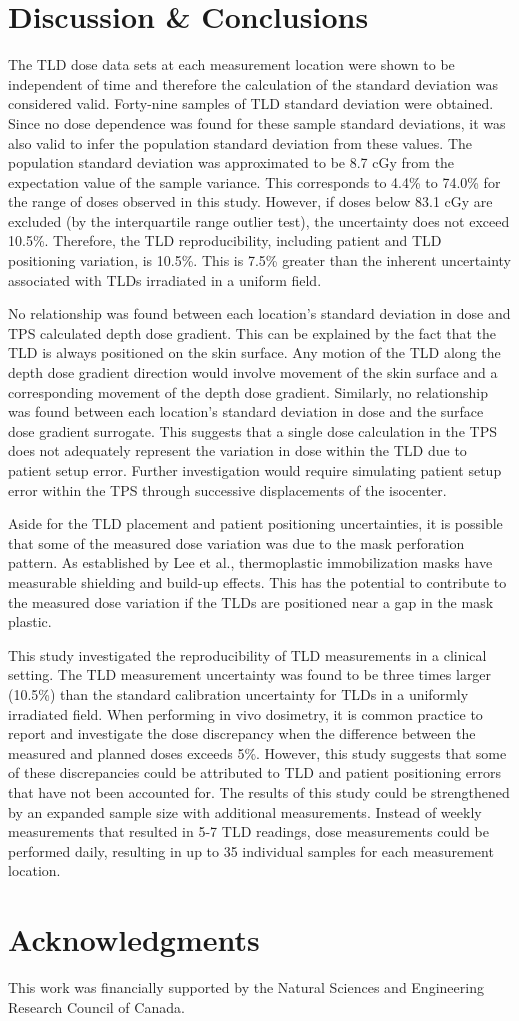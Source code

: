 \section{Discussion \& Conclusions}
The TLD dose data sets at each measurement location were shown to be independent of time and therefore the calculation of the standard deviation was considered valid. Forty-nine samples of TLD standard deviation were obtained. Since no dose dependence was found for these sample standard deviations, it was also valid to infer the population standard deviation from these values. The population standard deviation was approximated to be 8.7 cGy from the expectation value of the sample variance. This corresponds to 4.4\% to 74.0\% for the range of doses observed in this study. However, if doses below 83.1 cGy are excluded (by the interquartile range outlier test), the uncertainty does not exceed 10.5\%. Therefore, the TLD reproducibility, including patient and TLD positioning variation, is 10.5\%. This is 7.5\% greater than the inherent uncertainty associated with TLDs irradiated in a uniform field.

No relationship was found between each location’s standard deviation in dose and TPS calculated depth dose gradient. This can be explained by the fact that the TLD is always positioned on the skin surface. Any motion of the TLD along the depth dose gradient direction would involve movement of the skin surface and a corresponding movement of the depth dose gradient. Similarly, no relationship was found between each location’s standard deviation in dose and the surface dose gradient surrogate. This suggests that a single dose calculation in the TPS does not adequately represent the variation in dose within the TLD due to patient setup error. Further investigation would require simulating patient setup error within the TPS through successive displacements of the isocenter.

Aside for the TLD placement and patient positioning uncertainties, it is possible that some of the measured dose variation was due to the mask perforation pattern. As established by Lee et al.\cite{Lee2002}, thermoplastic immobilization masks have measurable shielding and build-up effects. This has the potential to contribute to the measured dose variation if the TLDs are positioned near a gap in the mask plastic.

This study investigated the reproducibility of TLD measurements in a clinical setting. The TLD measurement uncertainty was found to be three times larger (10.5\%) than the standard calibration uncertainty for TLDs in a uniformly irradiated field. When performing in vivo dosimetry, it is common practice to report and investigate the dose discrepancy when the difference between the measured and planned doses exceeds 5\%.\cite{Essers1999} However, this study suggests that some of these discrepancies could be attributed to TLD and patient positioning errors that have not been accounted for. The results of this study could be strengthened by an expanded sample size with additional measurements. Instead of weekly measurements that resulted in 5-7 TLD readings, dose measurements could be performed daily, resulting in up to 35 individual samples for each measurement location.

\section*{Acknowledgments}
This work was financially supported by the Natural Sciences and Engineering Research Council of Canada.